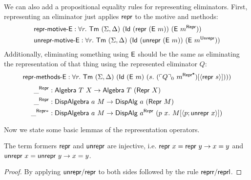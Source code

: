We can also add a propositional equality rules for representing eliminators.
First, representing an eliminator just applies $\textsf{repr}$ to the motive and methods:
\begin{align*}
&\mta{repr-motive-E} : \forall r.\ \Tm\ (\Sigma, \Delta)\ (\mta{Id}\ (\Mrepr\ (\mta{E}\ m))\ (\mta{E}\ m^\mta{Repr})) \\
&\mta{unrepr-motive-E} : \forall r.\ \Tm\ (\Sigma, \Delta)\ (\mta{Id}\ (\Munrepr\ (\mta{E}\ m))\ (\mta{E}\ m^\mta{Unrepr}))
\end{align*}
Additionally, eliminating something using $\textsf{E}$ should be the same as
eliminating the representation of that thing using the represented eliminator $Q$:
\begin{align*}
&\mta{repr-methods-E} : \forall r.\ \Tm\ (\Sigma, \Delta)\ (\mta{Id}\ (\mta{E}\ m)\ (s.\ (\emb{Q}_0\ m^{\mta{Repr*}})[\Msub{\mta{repr}\ s}]))) \\
\end{align*}
\begin{align*}
\_^{\mta{Repr}} &: \mta{Algebra}\ T\ X \to \mta{Algebra}\ T\ (\mta{Repr}\ X) \\
 \_^{\mta{Repr}} &: \mta{DispAlgebra}\ a\ M \to \mta{DispAlg}\ a\ (\MRepr\ M) \\
 \_^{\mta{Repr}*} &: \mta{DispAlgebra}\ a\ M \to \mta{DispAlg}\ a^{\mta{Repr}}\ (p\ x .\ M[\Msub{p;\mta{unrepr}\ x}])
\end{align*}

Now we state some basic lemmas of the representation operators.

\begin{lemma}
	The term formers $\textsf{repr}{}$ and $\textsf{unrepr}{}$ are injective, i.e.
	$\textsf{repr}\ x = \textsf{repr}\ y \to x = y$ and $\textsf{unrepr}\ x = \textsf{unrepr}\ y \to x = y$.
	\begin{proof}
				By applying $\textsf{unrepr}/\textsf{repr}$ to both sides
				followed by the rule $\textsf{reprr}/\textsf{reprl}$.
	\end{proof}
\end{lemma}



